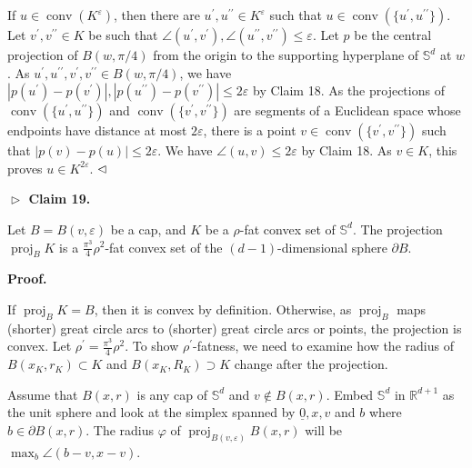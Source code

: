 If $u\in\operatorname{conv}(K^{\varepsilon})$, then there are $u^{\prime},u^{\prime\prime}\in K^{\varepsilon}$ such that $u\in\operatorname{conv}(\{u^{\prime},u^{\prime\prime}\})$. Let $v^{\prime},v^{\prime\prime}\in K$ be such that $\angle(u^{\prime},v^{\prime}),\angle(u^{\prime\prime},v^{\prime\prime})\leq\varepsilon$. Let $p$ be the central projection of $B(w,\pi/4)$ from the origin to the supporting hyperplane of $\mathbb{S}^{d}$ at $w$. As $u^{\prime},u^{\prime\prime},v^{\prime},v^{\prime\prime}\in B(w,\pi/4)$, we have $|p(u^{\prime})-p(v^{\prime})|,|p(u^{\prime\prime})-p(v^{\prime\prime})|\leq 2\varepsilon$ by Claim 18. As the projections of $\operatorname{conv}(\{u^{\prime},u^{\prime\prime}\})$ and $\operatorname{conv}(\{v^{\prime},v^{\prime\prime}\})$ are segments of a Euclidean space whose endpoints have distance at most $2\varepsilon$, there is a point $v\in\operatorname{conv}(\{v^{\prime},v^{\prime\prime}\})$ such that $|p(v)-p(u)|\leq 2\varepsilon$. We have $\angle(u,v)\leq 2\varepsilon$ by Claim 18. As $v\in K$, this proves $u\in K^{2\varepsilon}$. $\hfill\vartriangleleft$
\par
\par
\par\medskip\noindent\textbf{$\vartriangleright$ Claim 19.}\par
Let $B=B(v,\varepsilon)$ be a cap, and $K$ be a $\rho$-fat convex set of $\mathbb{S}^{d}$. The projection $\operatorname{proj}_{B}K$ is a $\frac{\pi^{3}}{4}\rho^{2}$-fat convex set of the $(d-1)$-dimensional sphere $\partial B$.
\par
\par
\par
\par
\par\medskip\noindent\textbf{Proof.}\par
If $\operatorname{proj}_{B}K=B$, then it is convex by definition. Otherwise, as $\operatorname{proj}_{B}$ maps (shorter) great circle arcs to (shorter) great circle arcs or points, the projection is convex. Let $\rho^{\prime}=\frac{\pi^{3}}{4}\rho^{2}$. To show $\rho^{\prime}$-fatness, we need to examine how the radius of $B(x_{K},r_{K})\subset K$ and $B(x_{K},R_{K})\supset K$ change after the projection.
\par
\par
Assume that $B(x,r)$ is any cap of $\mathbb{S}^{d}$ and $v\not\in B(x,r)$. Embed $\mathbb{S}^{d}$ in $\mathbb{R}^{d+1}$ as the unit sphere and look at the simplex spanned by $\underline{0},x,v$ and $b$ where $b\in\partial B(x,r)$. The radius $\varphi$ of $\operatorname{proj}_{B(v,\varepsilon)}B(x,r)$ will be $\max_{b}\angle(b-v,x-v)$.
